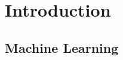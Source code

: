 \section{Introduction}
\label{sec:introduction}
\subsection{Machine Learning}
\label{subsec:introduction-definition}
\begin{frame}{\insertsubsection}
	
\end{frame}